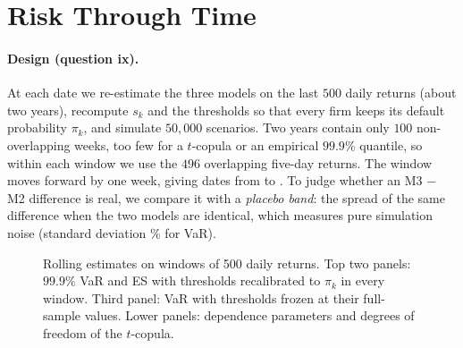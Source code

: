 \section{Risk Through Time}
\label{sec:rolling}


\paragraph{Design (question ix).}
At each date we re-estimate the three models on the last $500$ daily returns (about two years), recompute $s_k$ and the thresholds so that every firm keeps its default probability $\pi_k$, and simulate $50{,}000$ scenarios. Two years contain only $100$ non-overlapping weeks, too few for a $t$-copula or an empirical $99.9\%$ quantile, so within each window we use the $496$ overlapping five-day returns. The window moves forward by one week, giving  dates from  to . To judge whether an M3 $-$ M2 difference is real, we compare it with a \emph{placebo band}: the spread of the same difference when the two models are identical, which measures pure simulation noise (standard deviation \% for VaR).

\begin{figure}[p]
\centering
{}
\caption{Rolling estimates on windows of 500 daily returns. Top two panels: $99.9\%$ VaR and ES with thresholds recalibrated to $\pi_k$ in every window. Third panel: VaR with thresholds frozen at their full-sample values. Lower panels: dependence parameters and degrees of freedom of the $t$-copula.}
\label{fig:rolling}
\end{figure}

\begin{table}[tb]
\caption{Rolling $99.9\%$ VaR and ES (USD),  windows of 500 daily returns.}
\label{tab:rolling}
\centering
{}
\end{table}


